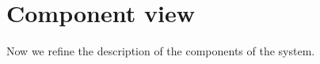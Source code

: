 \section{Component view}
Now we refine the description of the components of the system.





\pagebreak